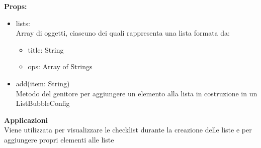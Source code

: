 \textbf{Props:} 
\begin{itemize}

\item lists: 
\\
Array di oggetti, ciascuno dei quali rappresenta una lista formata da:
\begin{itemize}
\item title: String
\item ops: Array of Strings

\end{itemize}
\item add(item: String)
\\
Metodo del genitore per aggiungere un elemento alla lista in costruzione in un ListBubbleConfig

\end{itemize} 


\textbf{Applicazioni}\\
Viene utilizzata per visualizzare le checklist durante la creazione delle liste e per aggiungere propri elementi alle liste 


\clearpage

